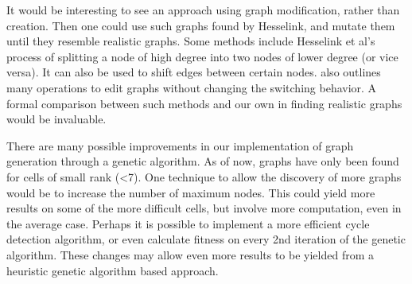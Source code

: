 \documentclass[12pt]{article}
\begin{document}
It would be interesting to see an approach using graph modification, rather than creation. Then one could use such graphs found by Hesselink, and mutate them until they resemble realistic graphs. Some methods include Hesselink et al's \cite{HH13} process of splitting a node of high degree into two nodes of lower degree (or vice versa). It can also be used to shift edges between certain nodes. \cite{v06} also outlines many operations to edit graphs without changing the switching behavior. A formal comparison between such methods and our own in finding realistic graphs would be invaluable.

There are many possible improvements in our implementation of graph generation through a genetic algorithm. As of now, graphs have only been found for cells of small rank (\textless 7). One technique to allow the discovery of more graphs would be to increase the number of maximum nodes. This could yield more results on some of the more difficult cells, but involve more computation, even in the average case. Perhaps it is possible to implement a more efficient cycle detection algorithm, or even calculate fitness on every 2nd iteration of the genetic algorithm. These changes may allow even more results to be yielded from a heuristic genetic algorithm based approach.


\end{document}
